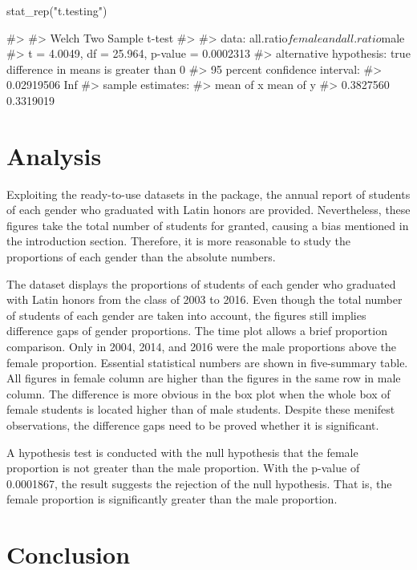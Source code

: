 \begin{Schunk}
\begin{Sinput}
stat_rep("t.testing")
\end{Sinput}
\begin{Soutput}
#> 
#>  Welch Two Sample t-test
#> 
#> data:  all.ratio$female and all.ratio$male
#> t = 4.0049, df = 25.964, p-value = 0.0002313
#> alternative hypothesis: true difference in means is greater than 0
#> 95 percent confidence interval:
#>  0.02919506        Inf
#> sample estimates:
#> mean of x mean of y 
#> 0.3827560 0.3319019
\end{Soutput}
\end{Schunk}

\section{Analysis}\label{analysis}

Exploiting the ready-to-use datasets in the package, the annual report
of students of each gender who graduated with Latin honors are provided.
Nevertheless, these figures take the total number of students for
granted, causing a bias mentioned in the introduction section.
Therefore, it is more reasonable to study the proportions of each gender
than the absolute numbers.

The dataset  displays the proportions of students of
each gender who graduated with Latin honors from the class of 2003 to
2016. Even though the total number of students of each gender are taken
into account, the figures still implies difference gaps of gender
proportions. The time plot allows a brief proportion comparison. Only in
2004, 2014, and 2016 were the male proportions above the female
proportion. Essential statistical numbers are shown in five-summary
table. All figures in female column are higher than the figures in the
same row in male column. The difference is more obvious in the box plot
when the whole box of female students is located higher than of male
students. Despite these menifest observations, the difference gaps need
to be proved whether it is significant.

A hypothesis test is conducted with the null hypothesis that the female
proportion is not greater than the male proportion. With the p-value of
0.0001867, the result suggests the rejection of the null hypothesis.
That is, the female proportion is significantly greater than the male
proportion.

\section{Conclusion}\label{conclusion}

